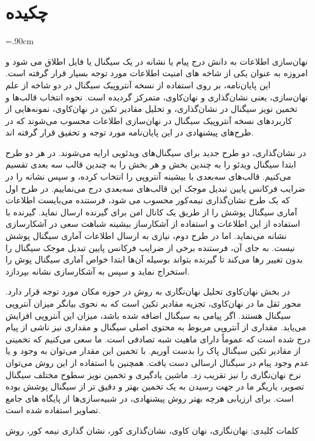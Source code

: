 \clearpage\newpage
\section*{چکیده}
\baselineskip=.90cm

نهان‌سازی اطلاعات به دانش درج پیام یا نشانه در یک سیگنال یا فایل اطلاق می شود و امروزه به عنوان یکی از شاخه­ های امنیت اطلاعات مورد توجه بسیار قرار گرفته است. این پایان‌نامه، بر روی استفاده از نسخه آنتروپیک سیگنال در دو شاخه از علم نهان‌سازی، یعنی نشان‌گذاری و نهان‌کاوی، متمرکز گردیده است.  نحوه انتخاب قالب‌ها و تخمین نویز سیگنال در نشان‌گذاری، و تحلیل مقادیر تکین در نهان‌کاوی، نمونه‌هایی از کاربردهای نسخه آنتروپیک سیگنال در نهان‌سازی اطلاعات محسوب می‌شوند که در طرح‌های پیشنهادی در این پایان‌نامه مورد توجه و تحقیق قرار گرفته اند. 

در نشان‌گذاری، دو طرح جدید  برای سیگنال‌های ویدئویی {} ارایه می‌شوند. در هر دو طرح ابتدا سیگنال ویدئو را به چندین بخش و هر بخش را به چندین قالب سه بعدی تقسیم‌ می‌کنیم. قالب‌های سه‌بعدی با بیشینه آنتروپی را انتخاب کرده، و سپس نشانه را در ضرایب فرکانس پایین تبدیل موجک این قالب‌های سه‌بعدی درج می‌نماییم. در طرح اول که یک طرح نشان‌گذاری نیمه‌کور محسوب می شود، فرستنده می‌بایست اطلاعات آماری سیگنال پوشش را از طریق یک کانال امن برای گیرنده ارسال نماید. گیرنده با استفاده از این اطلاعات و استفاده از آشکارساز بیشینه شباهت سعی در آشکارسازی نشانه می‌نماید. اما در طرح دوم، نیازی به ارسال اطلاعات آماری سیگنال پوشش نیست. به جای آن، فرستنده برخی از ضرایب فرکانس پایین تبدیل موجک سیگنال را بدون تغییر رها می‌کند تا گیرنده بتواند بوسیله آن‌ها ابتدا خواص آماری سیگنال پوش را استخراج نماید و سپس به آشکارسازی نشانه بپردازد. 

در بخش نهان‌کاوی تحلیل نهان‌نگاری به روش {} در حوزه مکان مورد توجه قرار دارد. محور ثقل ما در نهان‌کاوی، تجزیه مقادیر تکین است که به نحوی بیانگر میزان آنتروپی سیگنال هستند. اگر پیامی به سیگنال اضافه شده باشد، میزان این آنتروپی افزایش می‌یابد. مقداری از آنتروپی مربوط به محتوی اصلی سیگنال و مقداری نیز ناشی از پیام درج شده است که عموماً دارای ماهیت شبه تصادفی است. ما سعی می‌کنیم که تخمینی از مقادیر تکین سیگنال پاک را بدست آوریم. با تخمین این مقدار می‌توان به وجود و یا عدم وجود پیام در سیگنال ارسالی دست یافت. همچنین  با استفاده از این روش می‌توان نرخ نهان‌نگاری را نیز تقریب زد. ماشین یادگیری {} و تخمین نویز سطوح مختلف سیگنال تصویر، یاریگر ما در جهت رسیدن به یک تخمین بهتر و دقیق تر از سیگنال پوشش بوده است. برای ارزیابی هرچه بهتر روش پیشنهادی، در شبیه‌سازی‌ها از پایگاه های جامع تصاویر استفاده شده است. 

کلمات کلیدی: نهان‌نگاری، نهان کاوی، نشان‌گذاری کور، نشان گذاری نیمه کور، روش {}


